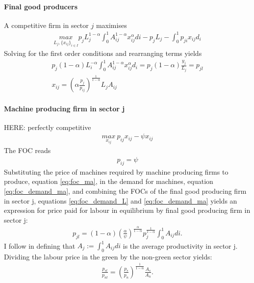 \paragraph{Final good producers}
A competitive firm in sector $j$ maximises
\begin{align*}
\underset{L_j, \{x_{ij}\}_{i \in I}}{max} p_j L_j^{1-\alpha} \int_{0}^{1}A_{ij}^{1-\alpha}x_{ij}^\alpha di - p_j L_j - \int_{0}^{1} p_{ji}x_{ij} d_i
\end{align*}
Solving for the first order conditions and rearranging terms yields
\begin{align}
p_j(1-\alpha) L_i^{-\alpha}\int_{0}^{1}A_{ij}^{1-\alpha}x_{ij}^\alpha d_i= p_j (1-\alpha)\frac{y_j}{L_j}=p_{jl}\label{eq:foc_demand_L}
\\
x_{ij} = \left(\alpha\frac{p_j}{p_{ij}}\right)^\frac{1}{1-\alpha}L_j A_{ij}\label{eq:foc_demand_ma}
\end{align}

\paragraph{Machine producing firm in sector j}
HERE: perfectly competitive
\begin{align*}
\underset{x_{ij}}{max}\  p_{ij}x_{ij}-\psi x_{ij}
\end{align*}
The FOC reads
\begin{align}\label{eq:foc_ma}
p_{ij}=\psi
\end{align}
Substituting the price of machines required by machine producing firms to produce,  equation \ref{eq:foc_ma}, in the demand for machines, equation \ref{eq:foc_demand_ma}, and combining the FOCs of the final good producing firm in sector j, equations \ref{eq:foc_demand_L} and \ref{eq:foc_demand_ma} yields an expression for price paid for labour in equilibrium by final good producing firm in sector j:
\begin{align}
p_{jl}= (1-\alpha)\left(\frac{\alpha}{\psi}\right)^\frac{\alpha}{1-\alpha}p_j^\frac{1}{1-\alpha}\int_{0}^{1} A_{ij} di.
\end{align}
I follow \cite{Acemoglu2012TheChange} in defining that $A_j:=\int_{0}^{1}A_{ij}di$ is the average productivity in sector j. 
Dividing the labour price in the green by the non-green sector yields:
\begin{align}
\frac{p_{sl}}{p_{nl}}= \left(\frac{p_s}{p_n}\right)^\frac{1}{1-\alpha} \frac{A_s}{A_n}.\label{eq:firms_labrel}
\end{align}

